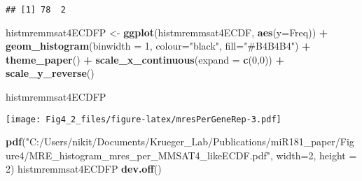 \documentclass[
]{article}
\newenvironment{Shaded}{\begin{snugshade}}{\end{snugshade}}
\newcommand{\AttributeTok}[1]{\textcolor[rgb]{0.13,0.29,0.53}{#1}}
\newcommand{\CommentTok}[1]{\textcolor[rgb]{0.56,0.35,0.01}{\textit{#1}}}
\newcommand{\DecValTok}[1]{\textcolor[rgb]{0.00,0.00,0.81}{#1}}
\newcommand{\FunctionTok}[1]{\textcolor[rgb]{0.13,0.29,0.53}{\textbf{#1}}}
\newcommand{\NormalTok}[1]{#1}
\newcommand{\OtherTok}[1]{\textcolor[rgb]{0.56,0.35,0.01}{#1}}
\newcommand{\SpecialCharTok}[1]{\textcolor[rgb]{0.81,0.36,0.00}{\textbf{#1}}}
\newcommand{\StringTok}[1]{\textcolor[rgb]{0.31,0.60,0.02}{#1}}
\begin{document}
\begin{Shaded}
\end{Shaded}

\begin{verbatim}
## [1] 78  2
\end{verbatim}

\begin{Shaded}
\begin{Highlighting}[]
\NormalTok{histmremmsat4ECDFP }\OtherTok{\textless{}{-}} \FunctionTok{ggplot}\NormalTok{(histmremmsat4ECDF, }\FunctionTok{aes}\NormalTok{(}\AttributeTok{y=}\NormalTok{Freq)) }\SpecialCharTok{+} 
  \FunctionTok{geom\_histogram}\NormalTok{(}\AttributeTok{binwidth =} \DecValTok{1}\NormalTok{, }\AttributeTok{colour=}\StringTok{"black"}\NormalTok{, }\AttributeTok{fill=}\StringTok{"\#B4B4B4"}\NormalTok{) }\SpecialCharTok{+}
  \FunctionTok{theme\_paper}\NormalTok{() }\SpecialCharTok{+}
  \FunctionTok{scale\_x\_continuous}\NormalTok{(}\AttributeTok{expand =} \FunctionTok{c}\NormalTok{(}\DecValTok{0}\NormalTok{,}\DecValTok{0}\NormalTok{)) }\SpecialCharTok{+}
  \FunctionTok{scale\_y\_reverse}\NormalTok{()}

\NormalTok{histmremmsat4ECDFP}
\end{Highlighting}
\end{Shaded}

\texttt{[image: Fig4\_2\_files/figure-latex/mresPerGeneRep-3.pdf]}

\begin{Shaded}
\begin{Highlighting}[]
\FunctionTok{pdf}\NormalTok{(}\StringTok{"C:/Users/nikit/Documents/Krueger\_Lab/Publications/miR181\_paper/Figure4/MRE\_histogram\_mres\_per\_MMSAT4\_likeECDF.pdf"}\NormalTok{, }\AttributeTok{width=}\DecValTok{2}\NormalTok{, }\AttributeTok{height =} \DecValTok{2}\NormalTok{)}
\NormalTok{histmremmsat4ECDFP}
\FunctionTok{dev.off}\NormalTok{()}
\end{Highlighting}
\end{Shaded}
\end{document}
